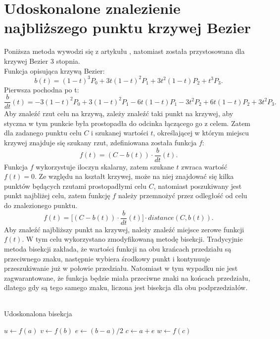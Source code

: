 \section{Udoskonalone znalezienie najbliższego punktu krzywej Bezier}
Poniższa metoda wywodzi się z artykułu \cite{ImprovedPointProjectionBezier}, natomiast została przystosowana dla krzywej Bezier 3 stopnia.\\
Funkcja opisująca krzywą Bezier:
\[ b(t) = (1 - t)^3 P_0 + 3t(1-t)^2 P_1 + 3t^2 (1-t) P_2 + t^3 P_3. \]
Pierwsza pochodna po t:
\[ \frac{b}{dt}(t) = -3 (1 - t)^2 P_0 + 3 (1-t)^2 P_1 - 6 t (1-t) P_1 - 3t^2 P_2 + 6 t (1-t) P_2 + 3t^2 P_3. \]
Aby znaleźć rzut celu na krzywą, zależy znaleźć taki punkt na krzywej, aby styczna w tym punkcie była prostopadła do odcinka łączącego go z celem. Zatem dla zadanego punktu celu $C$ i szukanej wartości $t$, określającej w którym miejscu krzywej znajduje się szukany rzut, zdefiniowana została funkcja $f$:
\[ f(t) = (C - b(t)) \cdot \frac{b}{dt}(t). \]
Funkcja $f$ wykorzystuje iloczyn skalarny, zatem szukane $t$ zwraca wartość $f(t) = 0$. Ze względu na kształt krzywej, może na niej znajdować się kilka punktów będących rzutami prostopadłymi celu $C$, natomiast poszukiwany jest punkt najbliżej celu, zatem funkcję $f$ należy przemnożyć przez odległość od celu do znalezionego punktu.
\[ f(t) = \big[ (C - b(t)) \cdot \frac{b}{dt}(t) \big] \cdot distance(C, b(t)). \]
Aby znaleźć najbliższy punkt na krzywej, należy znaleźć miejsce zerowe funkcji $f(t)$. W tym celu wykorzystano zmodyfikowaną metodę bisekcji. Tradycyjnie metoda bisekcji zakłada, że wartości funkcji na obu krańcach przedziału są przeciwnego znaku, następnie wybiera środkowy punkt i kontynuuje przeszukiwanie już w połowie przedziału. Natomiast w tym wypadku nie jest zagwarantowane, że funkcja będzie miała przeciwne znaki na końcach przedziału, dlatego gdy są tego samego znaku, liczona jest bisekcja dla obu podprzedziałów.
\\\\
\begin{algorithm}[H]
    \caption{Udoskonalona bisekcja}\label{alg}
    $u \gets f(a)$\;
    $v \gets f(b)$\;
    $e \gets (b-a)/2$\;
    $c \gets a+e$\;
    $w \gets f(c)$\;
\end{algorithm}
\phantom{.}\\

